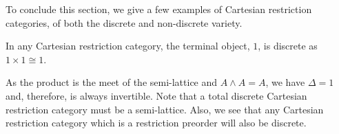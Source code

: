 To conclude this section, we give a few examples of Cartesian restriction categories, of both the
discrete and non-discrete variety.

\begin{example}\label{ex:terminal_object_is_discrete}
  In any Cartesian restriction category, the terminal object, $1$, is discrete as $1\times 1 \cong 1$.
\end{example}

\begin{example}\label{ex:semi-lattice_is_discrete}
  As the product is the meet of the semi-lattice and $A\wedge A = A$, we have $\Delta = 1$ and,
  therefore, is always invertible. Note that a total discrete Cartesian restriction category must be a
  semi-lattice. Also, we see that any Cartesian restriction category which is a restriction preorder
  will also be discrete.
\end{example}

